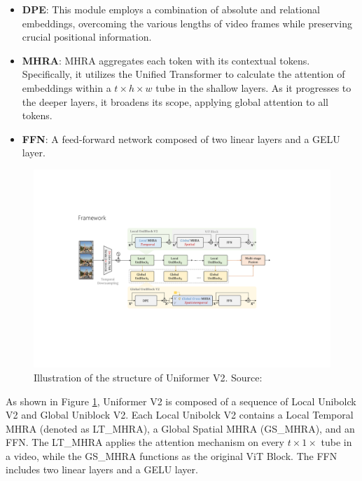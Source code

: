 \begin{itemize}
    \item \textbf{DPE}: This module employs a combination of absolute and relational embeddings, overcoming the various lengths of video frames while preserving crucial positional information.
    \item \textbf{MHRA}: MHRA aggregates each token with its contextual tokens. Specifically, it utilizes the Unified Transformer to calculate the attention of embeddings within a $t\times{h}\times{w}$ tube in the shallow layers. As it progresses to the deeper layers, it broadens its scope, applying global attention to all tokens.
    \item \textbf{FFN}: A feed-forward network composed of two linear layers and a GELU layer.
\end{itemize}

\begin{figure}[ht]
    \centering
    \includegraphics[width=1.0\textwidth]{assets/charts_rw/UniformerV2}
    \caption[The Structure of Uniformer V2]{Illustration of the structure of Uniformer V2. Source: \parencite{li2022uniformerv2}}
    \label{fig:structureuniformerv2}
\end{figure}

As shown in Figure \ref{fig:structureuniformerv2}, Uniformer V2 is composed of a sequence of Local Unibolck V2 and Global Uniblock V2. Each Local Unibolck V2 contains a Local Temporal MHRA (denoted as LT\_MHRA), a Global Spatial MHRA (GS\_MHRA), and an FFN. The LT\_MHRA applies the attention mechanism on every $t\times1\times$ tube in a video, while the GS\_MHRA functions as the original ViT Block. The FFN includes two linear layers and a GELU layer. 


